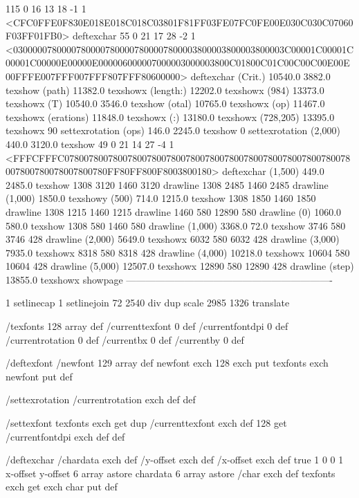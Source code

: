115 0 16 13 18 -1 1 {{<CFC0FFE0F830E018E018C018C03801F81FF03FE07FC0FE00E030C030C07060F03FF01FB0>}} deftexchar
55 0 21 17 28 -2 1 {{<03000007800007800007800007800007800003800003800003800003C00001C00001C00001C00000E00000E000006000007000003000003800C01800C01C00C00C00E00E00FFFE007FFF007FFF807FFF80600000>}} deftexchar
(Crit.) 10540.0 3882.0 texshow
(path) 11382.0 texshowx
(length:) 12202.0 texshowx
(984) 13373.0 texshowx
(T) 10540.0 3546.0 texshow
(otal) 10765.0 texshowx
(op) 11467.0 texshowx
(erations) 11848.0 texshowx
(:) 13180.0 texshowx
(728,205) 13395.0 texshowx
90 settexrotation
(ops) 146.0 2245.0 texshow
0 settexrotation
(2,000) 440.0 3120.0 texshow
49 0 21 14 27 -4 1 {{<FFFCFFFC07800780078007800780078007800780078007800780078007800780078007800780078007800780FF80FF800F8003800180>}} deftexchar
(1,500) 449.0 2485.0 texshow
1308 3120 1460 3120 drawline
1308 2485 1460 2485 drawline
(1,000) 1850.0 texshowy
(500) 714.0 1215.0 texshow
1308 1850 1460 1850 drawline
1308 1215 1460 1215 drawline
1460 580 12890 580 drawline
(0) 1060.0 580.0 texshow
1308 580 1460 580 drawline
(1,000) 3368.0 72.0 texshow
3746 580 3746 428 drawline
(2,000) 5649.0 texshowx
6032 580 6032 428 drawline
(3,000) 7935.0 texshowx
8318 580 8318 428 drawline
(4,000) 10218.0 texshowx
10604 580 10604 428 drawline
(5,000) 12507.0 texshowx
12890 580 12890 428 drawline
(step) 13855.0 texshowx
showpage
----------------------------------------------------------------

1 setlinecap 1 setlinejoin
72 2540 div dup scale
2985 1326 translate



/texfonts 128 array def
/currenttexfont 0 def
/currentfontdpi 0 def
/currentrotation 0 def
/currentbx 0 def
/currentby 0 def

/deftexfont
 { /newfont 129 array def
   newfont exch 128 exch put
   texfonts exch newfont put } def

/settexrotation
 { /currentrotation exch def } def

/settexfont
 { texfonts exch get dup /currenttexfont exch def
   128 get /currentfontdpi exch def } def

/deftexchar
 { /chardata exch def
   /y-offset exch def
   /x-offset exch def
   true
   1 0 0 1 x-offset y-offset 6 array astore
   chardata
   6 array astore /char exch def
   texfonts exch get exch char put } def

